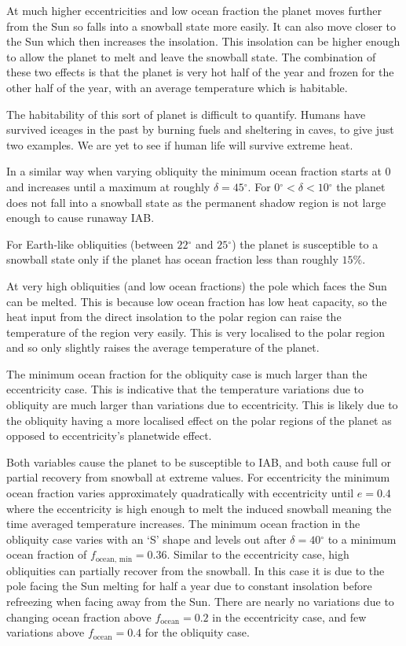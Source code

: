 \documentclass[12pt, onecolumn]{revtex4-2}    %
\newcommand{\degrees}{\ensuremath{^{\circ}}}
\begin{document}
At much higher eccentricities and low ocean fraction the planet moves further from the Sun so falls into a snowball state more easily.
It can also move closer to the Sun which then increases the insolation.
This insolation can be higher enough to allow the planet to melt and leave the snowball state.
The combination of these two effects is that the planet is very hot half of the year and frozen for the other half of the year, with an average temperature which is habitable.

The habitability of this sort of planet is difficult to quantify.
Humans have survived iceages in the past by burning fuels and sheltering in caves, to give just two examples.
We are yet to see if human life will survive extreme heat.

In a similar way when varying obliquity the minimum ocean fraction starts at 0 and increases until a maximum at roughly $\delta = 45\degrees$.
For $0\degrees < \delta < 10\degrees$ the planet does not fall into a snowball state as the permanent shadow region is not large enough to cause runaway IAB.

For Earth-like obliquities (between $22\degrees$ and $25\degrees$) the planet is susceptible to a snowball state only if the planet has ocean fraction less than roughly $15\%$.

At very high obliquities (and low ocean fractions) the pole which faces the Sun can be melted.
This is because low ocean fraction has low heat capacity, so the heat input from the direct insolation to the polar region can raise the temperature of the region very easily.
This is very localised to the polar region and so only slightly raises the average temperature of the planet.

The minimum ocean fraction for the obliquity case is much larger than the eccentricity case.
This is indicative that the temperature variations due to obliquity are much larger than variations due to eccentricity.
This is likely due to the obliquity having a more localised effect on the polar regions of the planet as opposed to eccentricity's planetwide effect.

Both variables cause the planet to be susceptible to IAB, and both cause full or partial recovery from snowball at extreme values.
For eccentricity the minimum ocean fraction varies approximately quadratically with eccentricity until $e = 0.4$ where the eccentricity is high enough to melt the induced snowball meaning the time averaged temperature increases.
The minimum ocean fraction in the obliquity case varies with an `S' shape and levels out after $\delta = 40\degrees$ to a minimum ocean fraction of $f_\text{ocean, min} = 0.36$.
Similar to the eccentricity case, high obliquities can partially recover from the snowball. In this case it is due to the pole facing the Sun melting for half a year due to constant insolation before refreezing when facing away from the Sun.
There are nearly no variations due to changing ocean fraction above $f_\text{ocean} = 0.2$ in the eccentricity case, and few variations above $f_\text{ocean} = 0.4$ for the obliquity case.
\end{document}
